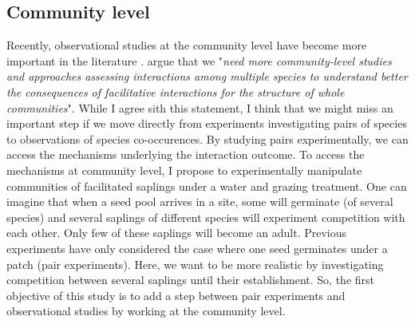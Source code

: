 \documentclass[12pt]{article} %
\begin{document}
\subsection{Community level}
Recently, observational studies at the community level have become more important in the literature \citep{Soliveres2012, Gross2013, Soliveres2014b}. %
\citet{Soliveres2014} argue that we "\textit{need more community-level studies and approaches assessing interactions among multiple species to understand better the consequences of facilitative interactions for the structure of whole communities}". 
While I agree sith this statement, I think that we might miss an important step if we move directly from experiments investigating pairs of species to observations of species co-occurences. By studying pairs experimentally, we can access the mechanisms underlying the interaction outcome. 
To access the mechanisms at community level, I propose to experimentally manipulate communities of facilitated saplings under a water and grazing treatment.
One can imagine that when a seed pool arrives in a site, some will germinate (of several species) and several saplings of different species will experiment competition with each other. Only few of these saplings will become an adult. Previous experiments have only considered the case where one seed germinates under a patch (pair experiments). Here, we want to be more realistic by investigating competition between several saplings until their establishment. So, the first objective of this study is to add a step between pair experiments and observational studies by working at the community level.
\end{document}
